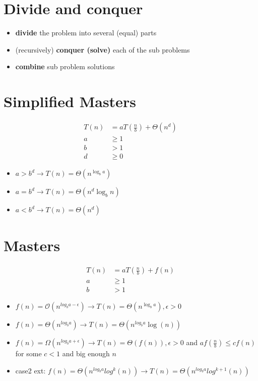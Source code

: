 \begin{multicols}{5}
\section{Divide and conquer}
\begin{itemize}
	\item \textbf{divide} the problem into several (equal) parts
	\item (recursively) \textbf{conquer (solve)} each of the sub problems
	\item \textbf{combine} sub problem solutions
\end{itemize}

\section{Simplified Masters}
\begin{align*}
	T(n) &= aT(\frac{n}{b})+\Theta(n^d) \\
	a &\geq 1 \\
	b &> 1 \\
	d &\geq 0
\end{align*}
\begin{itemize}
	\item $a > b^d \rightarrow T(n) = \Theta(n^{\log_ba})$
	\item $a = b^d \rightarrow T(n) = \Theta(n^d\log_bn)$
	\item $a < b^d \rightarrow T(n) = \Theta(n^d)$
\end{itemize}

\section{Masters}
\begin{align*}
	T(n) &= aT(\frac{n}{b})+f(n) \\
	a &\geq 1 \\
	b &> 1
\end{align*}
\begin{itemize}
	\item $f(n) = \mathcal{O}(n^{log_ba-\epsilon})\rightarrow T(n) = \Theta(n^{\log_ba}), \epsilon > 0$
	\item $f(n) = \Theta(n^{log_ba})\rightarrow T(n) = \Theta(n^{log_ba}\log(n))$
	\item $f(n) = \Omega(n^{log_ba+\epsilon})\rightarrow T(n) = \Theta(f(n)), \epsilon > 0$
		and $af(\frac{n}{b}) \leq cf(n)$ for some $c < 1$ and big enough $n$
	\item case2 ext: $f(n) = \Theta(n^{log_ba}log^k(n)) \rightarrow T(n) = \Theta(n^{log_ba}log^{k+1}(n))$
\end{itemize}



\end{multicols}
